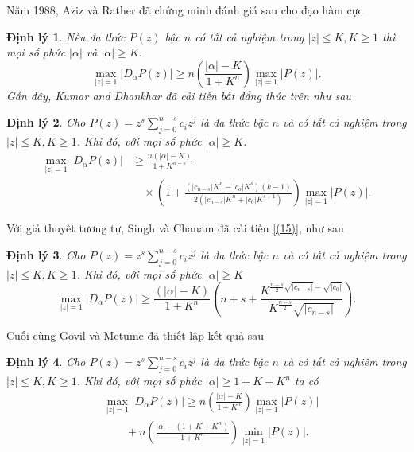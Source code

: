 \documentclass[a5paper,12pt]{report}
\theoremstyle{definition}
\newtheorem{dinhly}{Định lý}[section]
\newcommand{\dl}{\begin{dinhly}\itshape}
\newcommand{\hdl}{\end{dinhly}}
\numberwithin{equation}{chapter}
\def\vt{\vert}
\def\vt{\vert}
\def\vt{\vert}
\begin{document}
	Năm 1988, Aziz và Rather \cite{Az} đã chứng minh đánh giá sau cho đạo hàm cực
	\dl Nếu đa thức $P(z)$ bậc $n$ có tất cả nghiệm trong $|z| \le K, K \ge 1$ thì mọi số phức $|\alpha|$ và $|\alpha| \ge K.$
	\begin{equation}\label{(14)}
		\max\limits_{\vt z\vt=1}|D_\alpha P(z)| \ge n\left(\frac{|\alpha|-K}{1+K^n}\right)\max\limits_{\vt z\vt=1}|P(z)|.
	\end{equation}
	Gần đây, Kumar and Dhankhar \cite{kumar2020some} đã cải tiến bất đẳng thức trên như sau\hdl
	\dl Cho $P(z)=z^s\sum_{j=0}^{n-s}c_iz^j$ là đa thức bậc $n$ và có tất cả nghiệm trong $|z| \le K, K\ge 1$. Khi đó,  với mọi số phức $|\alpha| \ge K$.
	\begin{equation}\label{(15)}
		\begin{aligned}
			\max\limits_{\vt z\vt=1}|D_\alpha P(z)| & \ge \frac{n(|\alpha|-K)}{1+K^{n-s}} \\
			& \quad \times \left(1+\frac{(|c_{n-s}|K^n-|c_o|K^s)(k-1)}{2(|c_{n-s}|K^n+|c_0|K^{s+1})}\right)\max\limits_{\vt z\vt=1}|P(z)|.
		\end{aligned}
	\end{equation}
	\hdl
	Với giả thuyết tương tự, Singh và Chanam \cite{singh2021generalizations} đã cải tiến \eqref{(15)},  như sau
	\dl
	Cho $P(z)=z^s\sum_{j=0}^{n-s}c_iz^j$ là đa thức bậc $n$ và có tất cả nghiệm trong $|z| \le K, K\ge 1$. Khi đó,  với mọi số phức $|\alpha| \ge K$
	\begin{equation}\label{(16)}
		\max\limits_{\vt z\vt=1}|D_\alpha P(z)| \ge \frac{(|\alpha|-K)}{1+K^n}\left(n+s+\frac{K^{\frac{n-s}{2}\sqrt{|c_{n-s}|}-\sqrt{|c_0|}}}{K^{\frac{n-s}{2}}\sqrt{|c_{n-s}|}}\right).
	\end{equation}
	\hdl
	Cuối cùng Govil và Metume \cite{govil2004some} đã thiết lập kết quả sau
	\dl
	Cho $P(z)=z^s\sum_{j=0}^{n-s}c_iz^j$ là đa thức bậc $n$ và có tất cả nghiệm trong $|z| \le K, K\ge 1$. Khi đó,  với mọi số phức $|\alpha| \ge 1+K+K^n$ ta có
	\begin{equation}\label{(17)}
		\begin{split}
			& \max\limits_{\vt z\vt=1}|D_\alpha P(z)| \ge n\left(\frac{|\alpha|-K}{1+K^n}\right)\max\limits_{\vt z\vt=1}|P(z)| \\
			& \qquad +n\left(\frac{|\alpha|-(1+K+K^n)}{1+K^n}\right)\min\limits_{\vt z\vt=1}|P(z)|.
		\end{split}
	\end{equation}
	\hdl
\end{document}
